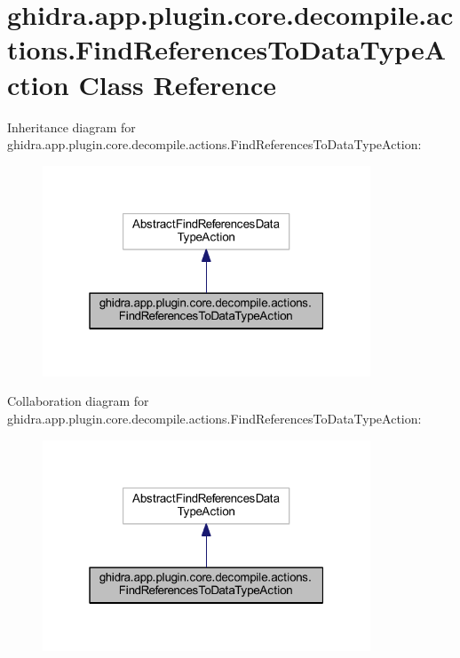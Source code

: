 \hypertarget{classghidra_1_1app_1_1plugin_1_1core_1_1decompile_1_1actions_1_1_find_references_to_data_type_action}{}\section{ghidra.\+app.\+plugin.\+core.\+decompile.\+actions.\+Find\+References\+To\+Data\+Type\+Action Class Reference}
\label{classghidra_1_1app_1_1plugin_1_1core_1_1decompile_1_1actions_1_1_find_references_to_data_type_action}


Inheritance diagram for ghidra.\+app.\+plugin.\+core.\+decompile.\+actions.\+Find\+References\+To\+Data\+Type\+Action\+:
\nopagebreak
\begin{figure}[H]
\begin{center}
\leavevmode
\includegraphics[width=277pt]{classghidra_1_1app_1_1plugin_1_1core_1_1decompile_1_1actions_1_1_find_references_to_data_type_action__inherit__graph}
\end{center}
\end{figure}


Collaboration diagram for ghidra.\+app.\+plugin.\+core.\+decompile.\+actions.\+Find\+References\+To\+Data\+Type\+Action\+:
\nopagebreak
\begin{figure}[H]
\begin{center}
\leavevmode
\includegraphics[width=277pt]{classghidra_1_1app_1_1plugin_1_1core_1_1decompile_1_1actions_1_1_find_references_to_data_type_action__coll__graph}
\end{center}
\end{figure}
